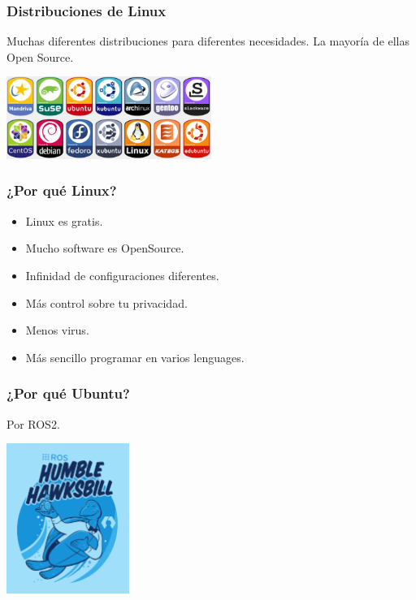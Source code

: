 \documentclass[10pt]{beamer}
\begin{document}
	\begin{frame}
		\frametitle{Distribuciones de Linux}
		Muchas diferentes distribuciones para diferentes necesidades. La mayoría de ellas Open Source.\\
		\begin{center}
			\includegraphics[width=0.5\textwidth]{linux_logo}
		\end{center}
	\end{frame}
	
	\begin{frame}
		\frametitle{¿Por qué Linux?}
		\begin{itemize}
			\item Linux es gratis.\\
			\item Mucho software es OpenSource.\\
			\item Infinidad de configuraciones diferentes.\\
			\item Más control sobre tu privacidad.\\
			\item Menos virus.\\
			\item Más sencillo programar en varios lenguages.
		\end{itemize}
	\end{frame}
	
	\begin{frame}
		\frametitle{¿Por qué Ubuntu?}
		Por ROS2.\\
		
		\begin{center}
			\includegraphics[width=0.3\textwidth]{ros2}
		\end{center}
	\end{frame}
	
\end{document}
